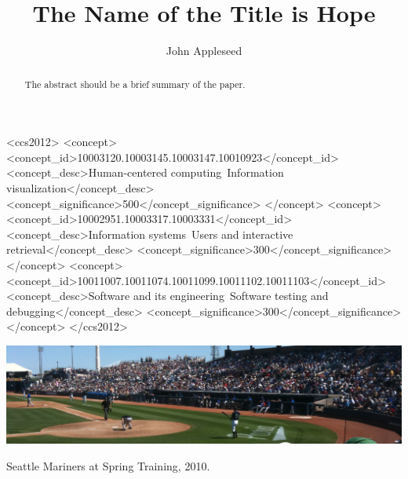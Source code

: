 \documentclass[manuscript,anonymous,review]{_acm/acmart}
\begin{document}
\title{The Name of the Title is Hope}

\author{John Appleseed}

\renewcommand{\shortauthors}{Appleseed, et al.}

\begin{abstract}
  The abstract should be a brief summary of the paper.
\end{abstract}

\begin{CCSXML}
<ccs2012>
  <concept>
    <concept_id>10003120.10003145.10003147.10010923</concept_id>
    <concept_desc>Human-centered computing~Information visualization</concept_desc>
    <concept_significance>500</concept_significance>
  </concept>
  <concept>
    <concept_id>10002951.10003317.10003331</concept_id>
    <concept_desc>Information systems~Users and interactive retrieval</concept_desc>
    <concept_significance>300</concept_significance>
    </concept>
  <concept>
    <concept_id>10011007.10011074.10011099.10011102.10011103</concept_id>
    <concept_desc>Software and its engineering~Software testing and debugging</concept_desc>
    <concept_significance>300</concept_significance>
  </concept>
</ccs2012>
\end{CCSXML}




\begin{teaserfigure}
  \includegraphics[width=\textwidth]{figures/sampleteaser}
  \caption{Seattle Mariners at Spring Training, 2010.}
  \label{fig:teaser}
\end{teaserfigure}
\end{document}
